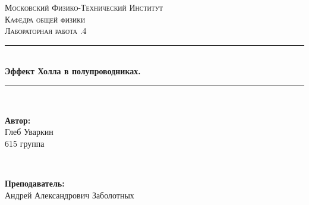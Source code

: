 \documentclass[a4paper, 12pt, twoside]{article}
\begin{document}
\begin{titlepage}

\newcommand{\HRule}{\rule{\linewidth}{0.7mm}} %

\center %
 

\textsc{\LARGE Московский Физико-Технический Институт}\\[1,5cm] %
\textsc{\Large Кафедра общей физики}\\[0.5cm] %
\textsc{\large Лабораторная работа .4}\\[0.5cm] %


\HRule
\\[0.4cm]
{ \huge \bfseries Эффект Холла в полупроводниках.}
\\[0.2cm] %
\HRule
\\[1.5cm]


 

\begin{minipage}{0.4\textwidth}
	\begin{flushleft} \large
		\textbf{Автор:}\\
		Глеб Уваркин \\
		615 группа
	\end{flushleft}
\end{minipage}
~
\begin{minipage}{0.4\textwidth}
	\begin{flushright} \large
		\textbf {Преподаватель:} \\
		Андрей Александрович Заболотных %
	\end{flushright}
\end{minipage}


\end{titlepage}
\end{document}
